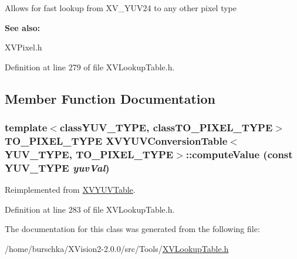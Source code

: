 Allows for fast lookup from XV\_\-YUV24 to any other pixel type

\begin{Desc}
\item[{\bf See also: }]\par
 XVPixel.h \end{Desc}




Definition at line 279 of file XVLookup\-Table.h.

\subsection{Member Function Documentation}
\label{XVYUVConversionTable_b0}
\hypertarget{class_XVYUVConversionTable_b0}{
\subsubsection[computeValue]{\setlength{\rightskip}{0pt plus 5cm}template$<$classYUV\_\-TYPE, classTO\_\-PIXEL\_\-TYPE$>$ TO\_\-PIXEL\_\-TYPE XVYUVConversion\-Table$<$YUV\_\-TYPE, TO\_\-PIXEL\_\-TYPE$>$::compute\-Value (const YUV\_\-TYPE {\em yuv\-Val})}}




Reimplemented from \hyperlink{class_XVYUVTable}{XVYUVTable}.

Definition at line 283 of file XVLookup\-Table.h.

The documentation for this class was generated from the following file:\begin{CompactItemize}
\item 
/home/burschka/XVision2-2.0.0/src/Tools/\hyperlink{XVLookupTable.h-source}{XVLookup\-Table.h}\end{CompactItemize}
